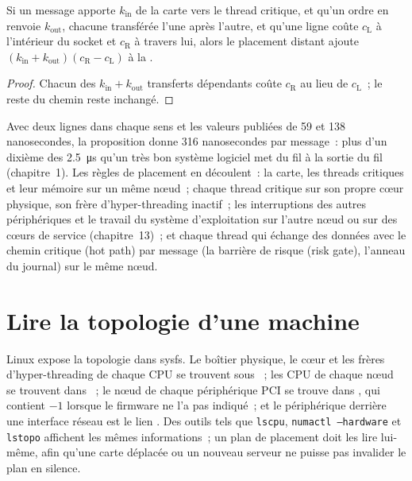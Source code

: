 \begin{proposition}\label{prop:ll:multi-socket-machines-and-interconnects:remote}
Si un message apporte $k_{\mathrm{in}}$  de la carte vers le thread critique, et qu'un ordre en renvoie $k_{\mathrm{out}}$,
chacune transférée l'une après l'autre, et qu'une ligne coûte $c_{\mathrm L}$ à l'intérieur du socket et $c_{\mathrm R}$ à travers lui, alors
le placement distant ajoute $(k_{\mathrm{in}} + k_{\mathrm{out}})(c_{\mathrm R} - c_{\mathrm L})$ à la .
\end{proposition}

\begin{proof}
Chacun des $k_{\mathrm{in}} + k_{\mathrm{out}}$ transferts dépendants coûte $c_{\mathrm R}$ au lieu de $c_{\mathrm L}$~; le reste
du chemin reste inchangé.
\end{proof}

Avec deux lignes dans chaque sens et les valeurs publiées de 59 et 138 nanosecondes, la proposition donne 316 nanosecondes par message~:
plus d'un dixième des \qty{2.5}{\micro\second} qu'un très bon système logiciel met du fil à la sortie du fil (chapitre~1). Les
règles de placement en découlent~: la carte, les threads critiques et leur mémoire sur un même nœud~; chaque thread critique sur son propre cœur physique,
son frère d'hyper-threading inactif~; les interruptions des autres périphériques et le travail du système d'exploitation sur l'autre nœud ou
sur des cœurs de service (chapitre~13)~; et chaque thread qui échange des données avec le chemin critique (hot path) par message (la barrière de risque (risk gate),
l'anneau du journal) sur le même nœud.

\section{Lire la topologie d'une machine}

Linux expose la topologie dans sysfs. Le boîtier physique, le cœur et les frères d'hyper-threading de chaque CPU se trouvent sous
~; les CPU de chaque nœud se trouvent dans ~;
le nœud de chaque périphérique PCI se trouve dans , qui contient $-1$ lorsque le firmware ne l'a pas indiqué~; et
le périphérique derrière une interface réseau est le lien . Des outils tels que
\texttt{lscpu}, \texttt{numactl --hardware} et \texttt{lstopo} affichent les mêmes informations~; un plan de placement doit les lire
lui-même, afin qu'une carte déplacée ou un nouveau serveur ne puisse pas invalider le plan en silence.

